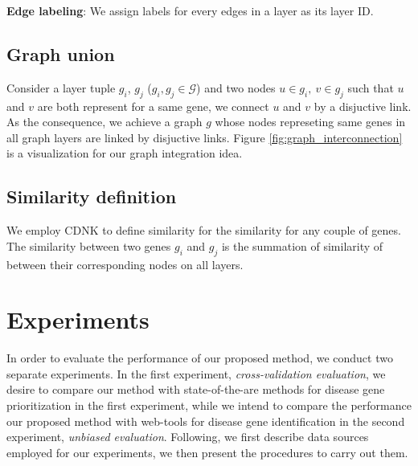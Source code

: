 \noindent \textbf{Edge labeling}: We assign labels for every edges in a layer as its layer ID.

\subsection*{Graph union} 
Consider a layer tuple $g_i$, $g_j$ ($g_i, g_j \in \mathcal{G}$) and two nodes $u\in g_i,\ v \in g_j$ such that $u$ and $v$ are both represent for a same gene, we connect $u$ and $v$ by a disjuctive link. As the consequence, we achieve a graph $g$ whose nodes represeting same genes in all graph layers are linked by disjuctive links. Figure \ref{fig:graph_interconnection} is a visualization for our graph integration idea. 

\subsection*{Similarity definition}
We employ CDNK to define similarity for the similarity for any couple of genes. The similarity between two genes $g_i$ and $g_j$ is the summation of similarity of between their corresponding nodes on all layers.
\section{Experiments}
In order to evaluate the performance of our proposed method, we conduct two separate experiments. In the first experiment, \textit{cross-validation evaluation}, we desire to compare our method with state-of-the-are methods for disease gene prioritization in the first experiment, while we intend to compare the performance our proposed method with web-tools for disease gene identification in the second experiment, \textit{unbiased evaluation}. Following, we first describe data sources employed for our experiments, we then present the procedures to carry out them.


